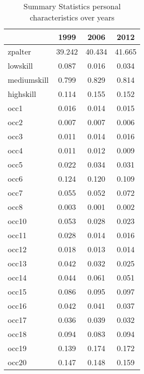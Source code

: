 \begin{table}[htbp]
\caption{\label{Tab:descrip_personal} Summary Statistics personal characteristics over years}\centering\medskip
\begin{tabular}{lccc} \hline \hline
 & 1999  & 2006  & 2012  \\  \hline 
zpalter &  39.242 &  40.434 &  41.665 \\  
lowskill &   0.087 &   0.016 &   0.034 \\  
mediumskill &   0.799 &   0.829 &   0.814 \\  
highskill &   0.114 &   0.155 &   0.152 \\  
occ1 &   0.016 &   0.014 &   0.015 \\  
occ2 &   0.007 &   0.007 &   0.006 \\  
occ3 &   0.011 &   0.014 &   0.016 \\  
occ4 &   0.011 &   0.012 &   0.009 \\  
occ5 &   0.022 &   0.034 &   0.031 \\  
occ6 &   0.124 &   0.120 &   0.109 \\  
occ7 &   0.055 &   0.052 &   0.072 \\  
occ8 &   0.003 &   0.001 &   0.002 \\  
occ10 &   0.053 &   0.028 &   0.023 \\  
occ11 &   0.028 &   0.014 &   0.016 \\  
occ12 &   0.018 &   0.013 &   0.014 \\  
occ13 &   0.042 &   0.032 &   0.025 \\  
occ14 &   0.044 &   0.061 &   0.051 \\  
occ15 &   0.086 &   0.095 &   0.097 \\  
occ16 &   0.042 &   0.041 &   0.037 \\  
occ17 &   0.036 &   0.039 &   0.032 \\  
occ18 &   0.094 &   0.083 &   0.094 \\  
occ19 &   0.139 &   0.174 &   0.172 \\  
occ20 &   0.147 &   0.148 &   0.159 \\  
\hline \hline \end{tabular}
\end{table}
